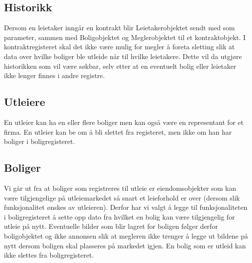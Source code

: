 \subsection{Historikk}
Dersom en leietaker inngår en kontrakt blir Leietakerobjektet sendt med som parameter, sammen med Boligobjektet og Meglerobjektet til et kontraktobjekt. I kontraktregisteret skal det ikke være mulig for megler å foreta sletting slik at data over hvilke boliger ble utleide når til hvilke leietakere. Dette vil da utgjøre historikken som vil være søkbar, selv etter at en eventuelt bolig eller leietaker ikke lenger finnes i andre registre.

\subsection{Utleiere}
En utleier kan ha en eller flere boliger men kan også være en representant for et firma. En utleier kan be om å bli slettet fra registeret, men ikke om han har boliger i boligregisteret. 

\subsection{Boliger}
Vi går ut fra at boliger som registreres til utleie er eiendomsobjekter som kan være tilgjengelige på utleiemarkedet så snart et leieforhold er over (dersom slik funksjonalitet ønskes av utleieren). Derfor har vi valgt å legge til funksjonaliteten i boligregisteret å sette opp dato fra hvilket en bolig kan være tilgjengelig for utleie på nytt. Eventuelle bilder som blir lagret for boligen følger derfor boligobjektet og ikke annonsen slik at megleren ikke trenger å legge ut bildene på nytt dersom boligen skal plasseres på markedet igjen. En bolig som er utleid kan ikke slettes fra boligregisteret.

